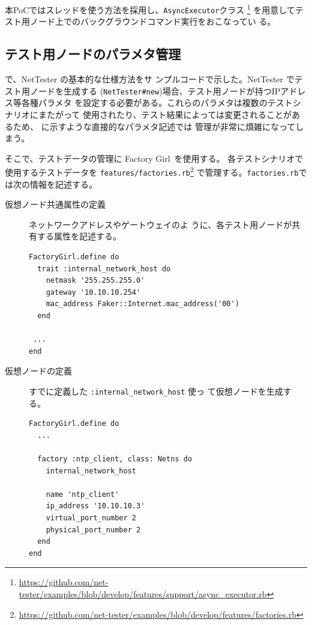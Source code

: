 本PoCではスレッドを使う方法を採用し、\verb|AsyncExecutor|クラス
\footnote{\url{https://github.com/net-tester/examples/blob/develop/features/support/async_executor.rb}}
を用意してテスト用ノード上でのバックグラウンドコマンド実行をおこなってい
る。

  \subsection{テスト用ノードのパラメタ管理}
  \label{sec:test-parameter-management}

で、NetTester の基本的な仕様方法をサ
ンプルコードで示した。NetTester でテスト用ノードを生成する
(\verb|NetTester#new|)場合、テスト用ノードが持つIPアドレス等各種パラメタ
を設定する必要がある。これらのパラメタは複数のテストシナリオにまたがって
使用されたり、テスト結果によっては変更されることがあるため、
に示すような直接的なパラメタ記述では
管理が非常に煩雑になってしまう。

そこで、テストデータの管理に Factory Girl~\cite{factory-girl}を使用する。
各テストシナリオで使用するテストデータを
\verb|features/factories.rb|\footnote{\url{https://github.com/net-tester/examples/blob/develop/features/factories.rb}}
で管理する。\verb|factories.rb|では次の情報を記述する。
\begin{description}
 \item[仮想ノード共通属性の定義] ネットワークアドレスやゲートウェイのよ
            うに、各テスト用ノードが共有する属性を記述する。
\begin{lstlisting}
FactoryGirl.define do
  trait :internal_network_host do
    netmask '255.255.255.0'
    gateway '10.10.10.254'
    mac_address Faker::Internet.mac_address('00')
  end

 ...
end
\end{lstlisting}
 \item[仮想ノードの定義] すでに定義した \verb|:internal_network_host| 使っ
            て仮想ノードを生成する。
\begin{lstlisting}
FactoryGirl.define do
  ...

  factory :ntp_client, class: Netns do
    internal_network_host

    name 'ntp_client'
    ip_address '10.10.10.3'
    virtual_port_number 2
    physical_port_number 2
  end
end
\end{lstlisting}
\end{description}


